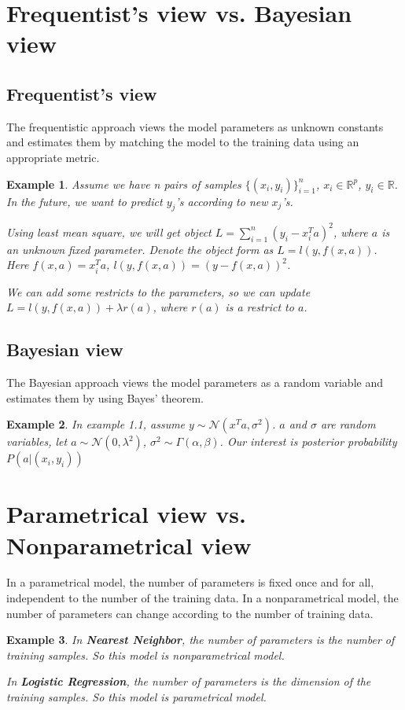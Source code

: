 \documentclass[11pt]{article}
\def\MN{{\mathcal N}}
\def\BR{{\mathbb R}}
\newtheorem{example}{Example}[section]
\begin{document}
\section{Frequentist's view vs. Bayesian view}
\subsection{Frequentist's view}
The frequentistic approach views the model parameters as unknown constants and estimates them by matching the model to the training data using an appropriate metric.

\begin{example}
Assume we have n pairs of samples $\{(x_i, y_i)\}_{i=1}^{n}$, $x_i \in \BR^p$, $y_i \in \BR$.
In the future, we want to predict $y_j$'s according to new $x_j$'s.

Using least mean square, we will get object $L = \sum_{i=1}^n (y_i - x_i^T a)^2$, where $a$ is an unknown fixed parameter.
Denote the object form as $L = l(y, f(x, a))$. Here $f(x,a) = x_i^T a$, $l(y, f(x, a)) = (y - f(x,a))^2$.

We can add some restricts to the parameters, so we can update $L = l(y, f(x,a)) + \lambda r(a)$, where $r(a)$ is a restrict to $a$.
\end{example}

\subsection{Bayesian view}
The Bayesian approach views the model parameters as a random variable and  estimates them by using Bayes' theorem.

\begin{example}
In example 1.1, assume $y \sim \MN(x^T a, \sigma^2)$. $a$ and $\sigma$ are random variables, let $a \sim \MN(0, \lambda^2)$, $\sigma^2 \sim \Gamma(\alpha, \beta)$.
Our interest is posterior probability $P(a | (x_i, y_i))$
\end{example}


\section{Parametrical view vs. Nonparametrical view}
In a parametrical model, the number of parameters is fixed once and for all, independent to the number of the training data.
In a nonparametrical model, the number of parameters can change according to the number of training data.

\begin{example}
In \textbf{Nearest Neighbor}, the number of parameters is the number of training samples. So this model is nonparametrical model.

In \textbf{Logistic Regression}, the number of parameters is the dimension of the training samples. So this model is parametrical model.
\end{example}
\end{document}
